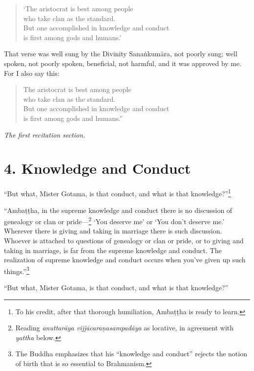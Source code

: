 \documentclass[12pt,openany]{book}%
\newcommand*{\scendsection}[1]{\begin{Center}\begin{small}\textit{#1}\end{small}\end{Center}\addvspace{1em}}
\begin{document}
\begin{verse}%
‘The aristocrat is best among people \\
who take clan as the standard. \\
But one accomplished in knowledge and conduct \\
is first among gods and humans.’ 

%
\end{verse}

That verse was well sung by the Divinity \textsanskrit{Sanaṅkumāra}, not poorly sung; well spoken, not poorly spoken, beneficial, not harmful, and it was approved by me. For I also say this: 

\begin{verse}%
The aristocrat is best among people \\
who take clan as the standard. \\
But one accomplished in knowledge and conduct \\
is first among gods and humans.” 

%
\end{verse}

\scendsection{The first recitation section. }

\section*{4. Knowledge and Conduct }

“But what, Mister Gotama, is that conduct, and what is that knowledge?”\footnote{To his credit, after that thorough humiliation, \textsanskrit{Ambaṭṭha} is ready to learn. } 

“\textsanskrit{Ambaṭṭha}, in the supreme knowledge and conduct there is no discussion of genealogy or clan or pride—\footnote{Reading \textit{\textsanskrit{anuttarāya} \textsanskrit{vijjācaraṇasampadāya}} as locative, in agreement with \textit{yattha} below. } ‘You deserve me’ or ‘You don’t deserve me.’ Wherever there is giving and taking in marriage there is such discussion. Whoever is attached to questions of genealogy or clan or pride, or to giving and taking in marriage, is far from the supreme knowledge and conduct. The realization of supreme knowledge and conduct occurs when you’ve given up such things.”\footnote{The Buddha emphasizes that his “knowledge and conduct” rejects the notion of birth that is so essential to Brahmanism. } 

“But what, Mister Gotama, is that conduct, and what is that knowledge?” 
\end{document}
